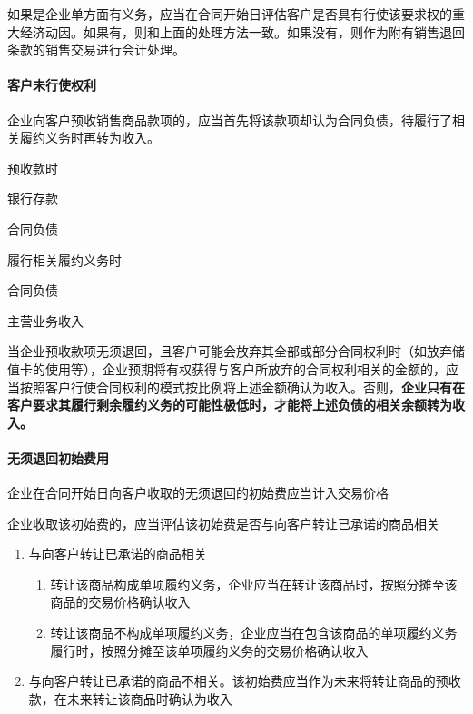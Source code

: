 \documentclass[UTF8,12pt]{ctexart}
\newenvironment{Dr}{%
	\begin{list}{}%
		{
			\setlength{\leftmargin}{2em}
			\setlength{\labelwidth}{2em}
			\setlength{\labelsep}{0pt}
			\setlength{\itemindent}{0pt}
			\setlength{\listparindent}{0pt}
			\setlength{\parsep}{0pt}
			\setlength{\topsep}{0pt}
		}
		\item[\textbf{借：}]
	}{%
	\end{list}
}
\newenvironment{Cr}{%
	\begin{list}{}%
		{
			\setlength{\leftmargin}{3em}
			\setlength{\labelwidth}{2em}
			\setlength{\labelsep}{0pt}
			\setlength{\itemindent}{0pt}
			\setlength{\listparindent}{0pt}
			\setlength{\parsep}{0pt}
			\setlength{\topsep}{0pt}
		}
		\item[\textbf{贷：}]
	}{%
	\end{list}
}
\numberwithin{equation}{section} %
\numberwithin{figure}{section}
\numberwithin{table}{section}
\begin{document}
	如果是企业单方面有义务，应当在合同开始日评估客户是否具有行使该要求权的重大经济动因。如果有，则和上面的处理方法一致。如果没有，则作为附有销售退回条款的销售交易进行会计处理。
	
	
	\paragraph{客户未行使权利}
	企业向客户预收销售商品款项的，应当首先将该款项却认为合同负债，待履行了相关履约义务时再转为收入。
	
	预收款时
	\begin{Dr}
		银行存款
	\end{Dr}
	\begin{Cr}
		合同负债
	\end{Cr}
	
	履行相关履约义务时
	\begin{Dr}
		合同负债
	\end{Dr}
	\begin{Cr}
		主营业务收入
	\end{Cr}
	
	当企业预收款项无须退回，且客户可能会放弃其全部或部分合同权利时（如放弃储值卡的使用等），企业预期将有权获得与客户所放弃的合同权利相关的金额的，应当按照客户行使合同权利的模式按比例将上述金额确认为收入。否则，\textbf{企业只有在客户要求其履行剩余履约义务的可能性极低时，才能将上述负债的相关余额转为收入。}
	
	
	\paragraph{无须退回初始费用}
	企业在合同开始日向客户收取的无须退回的初始费应当计入交易价格
	
	企业收取该初始费的，应当评估该初始费是否与向客户转让已承诺的商品相关
	\begin{enumerate}
		\item 与向客户转让已承诺的商品相关
		\begin{enumerate}
			\item 转让该商品构成单项履约义务，企业应当在转让该商品时，按照分摊至该商品的交易价格确认收入
			
			\item 转让该商品不构成单项履约义务，企业应当在包含该商品的单项履约义务履行时，按照分摊至该单项履约义务的交易价格确认收入
		\end{enumerate}
		
		\item 与向客户转让已承诺的商品不相关。该初始费应当作为未来将转让商品的预收款，在未来转让该商品时确认为收入
	\end{enumerate}
\end{document}
